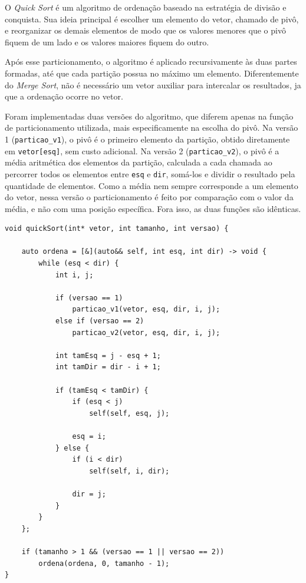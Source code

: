 \quad O \textit{Quick Sort} é um algoritmo de ordenação baseado na
estratégia de divisão e conquista. Sua ideia principal é escolher um
elemento do vetor, chamado de pivô, e reorganizar os demais elementos de
modo que os valores menores que o pivô fiquem de um lado e os valores
maiores fiquem do outro.

\quad Após esse particionamento, o algoritmo é aplicado recursivamente às
duas partes formadas, até que cada partição possua no máximo um elemento.
Diferentemente do \textit{Merge Sort}, não é necessário um vetor auxiliar
para intercalar os resultados, ja que a ordenação ocorre no vetor.

\quad Foram implementadas duas versões do algoritmo, que
diferem apenas na função de particionamento utilizada, mais
especificamente na escolha do pivô. Na versão 1 (\texttt{particao\_v1}),
o pivô é o primeiro elemento da partição, obtido diretamente em
\texttt{vetor[esq]}, sem custo adicional. Na versão 2
(\texttt{particao\_v2}), o pivô é a média aritmética dos elementos da
partição, calculada a cada chamada ao percorrer todos os elementos entre
\texttt{esq} e \texttt{dir}, somá-los e dividir o resultado pela
quantidade de elementos. Como a média nem sempre corresponde a um
elemento do vetor, nessa versão o particionamento é feito por comparação
com o valor da média, e não com uma posição específica. Fora isso, as duas funções são idênticas.

\newpage

\begin{lstlisting}[caption={Implementação do Quick Sort}]
void quickSort(int* vetor, int tamanho, int versao) {

    auto ordena = [&](auto&& self, int esq, int dir) -> void {
        while (esq < dir) {
            int i, j;

            if (versao == 1)
                particao_v1(vetor, esq, dir, i, j);
            else if (versao == 2)
                particao_v2(vetor, esq, dir, i, j);

            int tamEsq = j - esq + 1;
            int tamDir = dir - i + 1;

            if (tamEsq < tamDir) {
                if (esq < j)
                    self(self, esq, j);

                esq = i;
            } else {
                if (i < dir)
                    self(self, i, dir);

                dir = j;
            }
        }
    };

    if (tamanho > 1 && (versao == 1 || versao == 2))
        ordena(ordena, 0, tamanho - 1);
}
\end{lstlisting}


